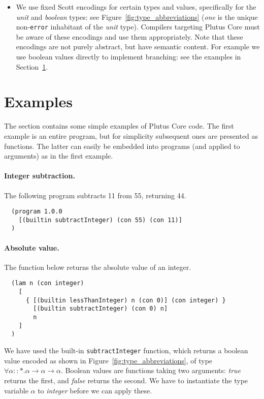 \documentclass[a4paper]{article}
\begin{document}
\begin{itemize}
  \item We use fixed Scott encodings for certain types and values,
    specifically for the \textit{unit} and \textit{boolean} types: see
    Figure~\ref{fig:type_abbreviations} (\textit{one} is the unique
    non-\verb|error| inhabitant of the \textit{unit} type).  Compilers
    targeting Plutus Core must be aware of these encodings and use
    them appropriately.  Note that these encodings are not purely
    abstract, but have semantic content. For example we use boolean
    values directly to implement branching: see the examples in
    Section~\ref{sec:examples}.
\end{itemize}


\section{Examples}
\label{sec:examples}
The section contains some simple examples of Plutus Core code. The
first example is an entire program, but for simplicity subsequent ones
are presented as functions. The latter can easily be embedded into
programs (and applied to arguments) as in the first example.

\paragraph{Integer subtraction.}
The following program subtracts 11 from 55, returning 44.

\begin{verbatim}
  (program 1.0.0
    [(builtin subtractInteger) (con 55) (con 11)]
  )
\end{verbatim}


\paragraph{Absolute value.} The function below returns the absolute value of an
integer.
\begin{verbatim}
  (lam n (con integer)
    [
      { [(builtin lessThanInteger) n (con 0)] (con integer) }
        [(builtin subtractInteger) (con 0) n]
        n
    ]
  )
\end{verbatim}

\noindent We have used the built-in \verb|subtractInteger|
function, which returns a boolean value encoded as shown in
Figure~\ref{fig:type_abbreviations}, of type
$\forall \alpha::\ast. \alpha \rightarrow \alpha \rightarrow \alpha$.
Boolean values are functions taking two arguments: \textit{true}
returns the first, and \textit{false} returns the second.  We have to
instantiate the type variable $\alpha$ to \textit{integer} before we
can apply these.
\end{document}
